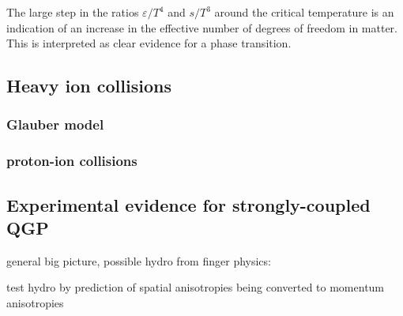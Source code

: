 The large step in the ratios $\varepsilon/T^4$ and $s/T^3$ around the critical temperature is an indication of an increase in the effective number of degrees of freedom in \qcd matter.
This is interpreted as clear evidence for a phase transition.

\subsection{Heavy ion collisions}
\subsubsection{Glauber model}
\cite{Miller:2007ri} %
\subsubsection{proton-ion collisions}

\subsection{Experimental evidence for strongly-coupled QGP}

general big picture, possible hydro from finger physics: \cite{Busza:2018rrf} %


test hydro by prediction of spatial anisotropies being converted to momentum anisotropies

